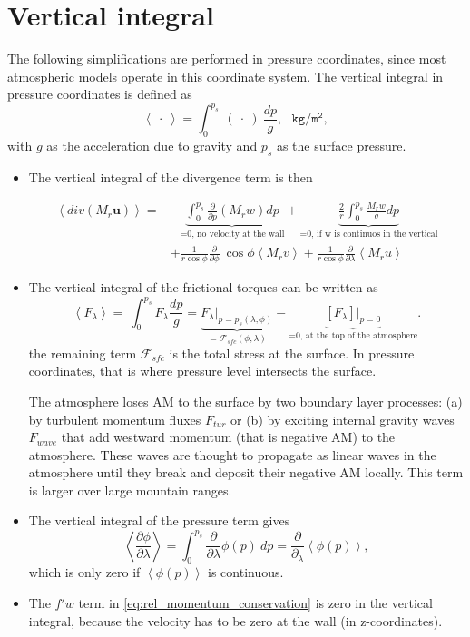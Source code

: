 \documentclass[11pt]{article}
\numberwithin{equation}{section}
\newcommand{\beq}{\begin{equation}}
\newcommand{\eeq}{\end{equation}}
\newcommand{\la}{\langle}
\newcommand{\ra}{\rangle}
\newcommand{\vect}[1]{\boldsymbol{#1}}
\newcommand{\lara}[1]{\left\la{#1}\right\ra}
\begin{document}
\section{Vertical integral}
The following simplifications are performed in pressure coordinates, since most atmospheric models operate in this coordinate system. The vertical integral in pressure coordinates is defined as 
\beq
\lara {~\cdot~} =  \int_0^{p_s} ~(~\cdot~)~ \frac{d p}{g},  ~~~\mathtt{kg /m^2},  
\eeq
with $g $ as the acceleration due to gravity and $p_s$ as the surface pressure.\par
\begin{itemize}
 \item The vertical integral of the divergence term is then 

\begin{align}
 \lara{div( M_r \vect u )} = &- \underbrace{\int_0^{p_s}  \frac{\partial}{\partial p} ( M_r w)  dp}_\text{=0, no velocity at the wall} 
 			+  \underbrace{\frac{2}{r}  \int_0^{p_s}   \frac{M_r w}{g}  d p }_\text{=0, if w is continuos in the vertical}\\
			&+ \frac{1}{r \cos{\phi}}  \frac{\partial}{\partial \phi}  ~\cos{\phi} \lara{M_r v } 
			+ \frac{1}{r \cos{\phi}} \frac{\partial}{\partial \lambda} \lara{M_r u}
\end{align}


\item The vertical integral of the frictional torques can be written as
\beq
\lara{F_\lambda}  = ~ \int_{0}^{p_s} F_\lambda \frac{d p}{g} = \underbrace{F_\lambda |_{p=p_s(
\lambda, \phi)}}_{= \mathcal{F}_{sfc}(\phi,\lambda)} -  \underbrace{[F_\lambda] |_{p=0}}_{\text{=0, at the top of the atmosphere}}. 
\eeq
the remaining term $\mathcal{F}_{sfc}$ is the total stress at the surface. In pressure coordinates, that is where pressure level intersects the surface.\par

The atmosphere loses AM to the surface by two boundary layer processes: (a) by turbulent momentum fluxes $F_{tur}$ or (b) by exciting internal gravity waves $F_{wave}$ that add westward momentum (that is negative AM) to the atmosphere. These waves are thought to propagate as linear waves in the atmosphere until they break and deposit their negative AM locally. This term is larger over large mountain ranges. %

\item The vertical integral of the pressure term gives
\beq
  \lara{ \frac{\partial \phi}{\partial \lambda}  } =    \int_0^{p_s}  \frac{\partial}{\partial \lambda} \phi(p)  ~dp = \frac{\partial}{\partial_\lambda} \lara{\phi(p) }, 
\eeq
which is only zero if $\lara{\phi(p) }$ is continuous.

\item The $f' w$ term in \eqref{eq:rel_momentum_conservation} is zero in the vertical integral, because the velocity has to be zero at the wall (in z-coordinates).
\end{itemize}
\end{document}
